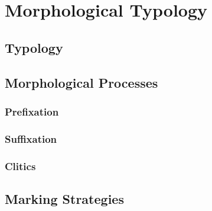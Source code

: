 \chapter{Morphological Typology}
\label{cha:tvk-morphological-typology}

\section{Typology}
\label{sec:tvk-typology}

\section{Morphological Processes}
\label{sec:tvk-morphological-processes}

\subsection{Prefixation}
\label{sec:tvk-prefixation}

\subsection{Suffixation}
\label{sec:tvk-suffixation}

\subsection{Clitics}
\label{sec:tvk-clitics}

\section{Marking Strategies}
\label{sec:tvk-marking-strategies}
